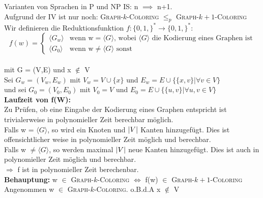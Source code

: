 \documentclass[answers]{submit}
\begin{document}
\begin{exercise}[7]{Varianten von Sprachen in P und NP}
{    IS: n $\implies$ n+1. \\

    Aufgrund der IV ist nur noch: \textsc{Graph-$k$-Coloring} $\leq_p$ \textsc{Graph-$k+1$-Coloring} \\

    Wir definieren die Reduktionsfunktion $f: \{0,1,\}^* \rightarrow \{0,1,\}^*$: \\

    $$f(w)=\begin{cases}
        \langle G_w\rangle  & \text{wenn w} = \langle G \rangle \text{, wobei }  \langle G \rangle \text{ die Kodierung eines Graphen ist} \\
        \langle G_0 \rangle & \text{wenn w} \neq \langle G \rangle \text{ sonst}
      \end{cases}$$ \\

    mit G = (V,E) und x $\notin$ V \\

    Sei $G_w = (V_w,E_w)$ mit $V_w=V \cup \{ x \}$ und  $E_w= E \cup \{ \{ x, v \} |\forall v \in V \}$  \\

    und sei $G_0 = (V_0,E_0)$ mit $V_0 = V$ und $E_0 = E \cup \{ \{ u,v  \} |\forall u,v \in V \} $ \\

    \textbf{Laufzeit von f(W):} \\

    Zu Prüfen, ob eine Eingabe der Kodierung eines Graphen entspricht ist trivialerweise in polynomieller Zeit berechbar möglich. \\

    Falls w = $\langle G \rangle$, so wird ein Knoten und $\left\vert V \right\vert$ Kanten hinzugefügt. Dies ist offensichtlicher weise in polynomieller Zeit möglich und berechbar. \\

    Falls w $ \neq\langle G \rangle$, so werden maximal $\left\vert V \right\vert$ neue Kanten hinzugefügt. Dies ist auch in polynomieller Zeit möglich und berechbar. \\

    $\Rightarrow$ f ist in polynomieller Zeit berechenbar. \\

    \textbf{Behauptung:} w $\in$ \textsc{Graph-$k$-Coloring} $\iff$ f(w) $\in $ \textsc{Graph-$k+1$-Coloring} \\

    Angenommen w $\in$ \textsc{Graph-$k$-Coloring}. o.B.d.A x $\notin$ V \\

}
\end{exercise}
\end{document}
